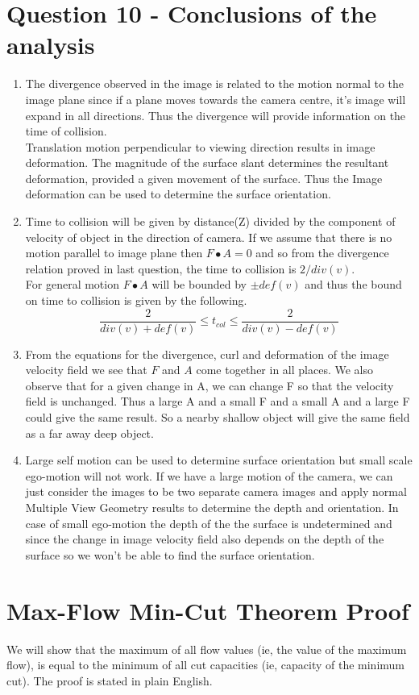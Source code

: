 \documentclass[12pt]{article}
\begin{document}
\section{Question 10 - Conclusions of the analysis}
\begin{enumerate}
\item The divergence observed in the image is related to the motion normal to the image plane since if a plane moves towards the camera centre, it's image will expand in all directions. Thus the divergence will provide information on the time of collision.\\
Translation motion perpendicular to viewing direction results in image deformation. The magnitude of the surface slant determines the resultant deformation, provided a given movement of the surface. Thus the Image deformation can be used to determine the surface orientation.
\item Time to collision will be given by distance(Z) divided by the component of velocity of object in the direction of camera. If we assume that there is no motion parallel to image plane then $F\bullet A = 0$ and so from the divergence relation proved in last question, the time to collision is $2/div(v)$.\\
For general motion $F\bullet A$ will be bounded by $\pm def(v)$ and thus the bound on time to collision is given by the following.
$$ \dfrac{2}{div(v)+def(v)} \leq t_{col} \leq \dfrac{2}{div(v)-def(v)}  $$
\item From the equations for the divergence, curl and deformation of the image velocity field we see that $F$ and $A$ come together in all places. We also observe that for a given change in A, we can change F so that the velocity field is unchanged. Thus a large A and a small F and a small A and a large F could give the same result. So a nearby shallow object will give the same field as a far away deep object.
\item Large self motion can be used to determine surface orientation but small scale ego-motion will not work. If we have a large motion of the camera, we can just consider the images to be two separate camera images and apply normal Multiple View Geometry results to determine the depth and orientation. In case of small ego-motion the depth of the the surface is undetermined and since the change in image velocity field also depends on the depth of the surface so we won't be able to find the surface orientation.
\end{enumerate}

\section{Max-Flow Min-Cut Theorem Proof}
We will  show that the maximum of all flow values (ie, the value of the maximum flow), is equal to the minimum of all cut capacities (ie, capacity of the minimum cut). The proof is stated in plain English.
\end{document}
